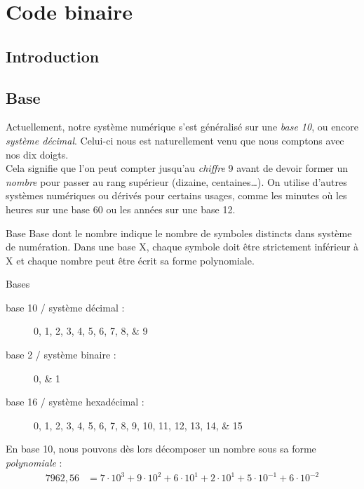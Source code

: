 \documentclass[a4paper, 11pt, twoside, fleqn]{memoir}
\begin{document}

	
\chapter{Code binaire}
\ChapFrame

\section{Introduction}

\section{Base}

Actuellement, notre système numérique s'est généralisé sur une \emph{base 10}, ou encore \emph{système décimal}. Celui-ci nous est naturellement venu que nous comptons avec nos dix doigts.\\ 
Cela signifie que l'on peut compter jusqu'au \emph{chiffre} 9 avant de devoir former un \emph{nombre} pour passer au rang supérieur (dizaine, centaines\ldots).
On utilise d'autres systèmes numériques ou dérivés pour certains usages, comme les minutes où les heures sur une base 60 ou les années sur une base 12.\\

\begin{definition}{Base}{}
Base dont le nombre indique le nombre de symboles distincts dans système de numération. Dans une base X, chaque symbole doit être strictement inférieur à X et chaque nombre peut être écrit sa forme polynomiale.
\begin{exemple*}{Bases}{}
\begin{description}
\item[base 10 / système décimal :] \numlist{0;1;2;3;4;5;6;7;8;9}
\item[base 2 / système binaire :] \numlist{0;1}
\item[base 16 / système hexadécimal :] \numlist{0;1;2;3;4;5;6;7;8;9;10;11;12;13;14;15}
\end{description}
\end{exemple*}
\end{definition}

En base 10, nous pouvons dès lors décomposer un nombre sous sa forme \emph{polynomiale} :
\begin{align*}
7962,56 &= 7\cdot10^3 + 9\cdot10^2 + 6\cdot10^1 + 2\cdot10^1 + 5\cdot10^{-1} + 6\cdot10^{-2}
\end{align*}
\end{document}
